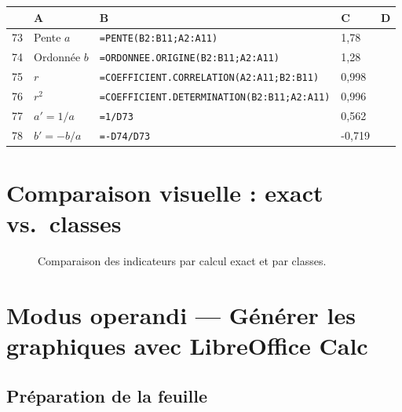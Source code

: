 \documentclass[11pt,a4paper]{article}
\newenvironment{calcsheet}[1][\footnotesize]
  {\begin{center}#1
   \begin{tabular}{|>{\columncolor{calchead}}c|l|l|l|l|}
   \hline
   \rowcolor{calchead}
   & \textbf{A} & \textbf{B} & \textbf{C} & \textbf{D} \\ \hline}
  {\end{tabular}\end{center}}
\newcommand{\fc}[1]{\textcolor{calcform}{\texttt{#1}}}
\begin{document}
\begin{calcsheet}
73 & Pente \( a \) & \fc{=PENTE(B2:B11;A2:A11)} & 1,78 & \\ \hline
74 & Ordonnée \( b \) & \fc{=ORDONNEE.ORIGINE(B2:B11;A2:A11)} & 1,28 & \\ \hline
75 & \( r \) & \fc{=COEFFICIENT.CORRELATION(A2:A11;B2:B11)} & 0,998 & \\ \hline
76 & \( r^2 \) & \fc{=COEFFICIENT.DETERMINATION(B2:B11;A2:A11)} & 0,996 & \\ \hline
77 & \( a' = 1/a \) & \fc{=1/D73} & 0,562 & \\ \hline
78 & \( b' = -b/a \) & \fc{=-D74/D73} & -0,719 & \\ \hline
\end{calcsheet}

\section{Comparaison visuelle : exact vs.\ classes}

\begin{figure}[H]
\centering
{}
\caption{Comparaison des indicateurs par calcul exact et par classes.}
\end{figure}

\section{Modus operandi — Générer les graphiques avec LibreOffice Calc}

\subsection{Préparation de la feuille}
\end{document}
